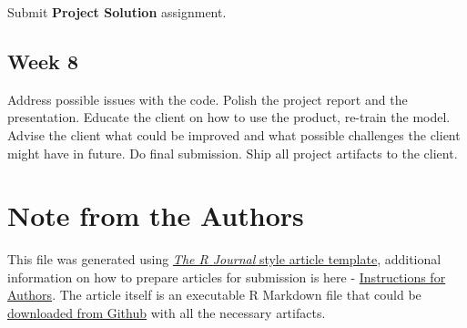 Submit \textbf{Project Solution} assignment.

\hypertarget{week-8}{%
\subsection{Week 8}\label{week-8}}

Address possible issues with the code. Polish the project report and the
presentation. Educate the client on how to use the product, re-train the
model. Advise the client what could be improved and what possible
challenges the client might have in future. Do final submission. Ship
all project artifacts to the client.



\hypertarget{note-from-the-authors}{%
\section{Note from the Authors}\label{note-from-the-authors}}

This file was generated using
\href{https://github.com/rstudio/rticles}{\emph{The R Journal} style
article template}, additional information on how to prepare articles for
submission is here -
\href{https://journal.r-project.org/share/author-guide.pdf}{Instructions
for Authors}. The article itself is an executable R Markdown file that
could be
\href{https://github.com/ivbsoftware/big-data-final-2/blob/master/docs/R_Journal/big-data-final-2/}{downloaded
from Github} with all the necessary artifacts.


\address{%
Vadim Spirkov\\
York University School of Continuing Studies\\
\\
}


\address{%
Murlidhar Loka\\
York University School of Continuing Studies\\
\\
}


